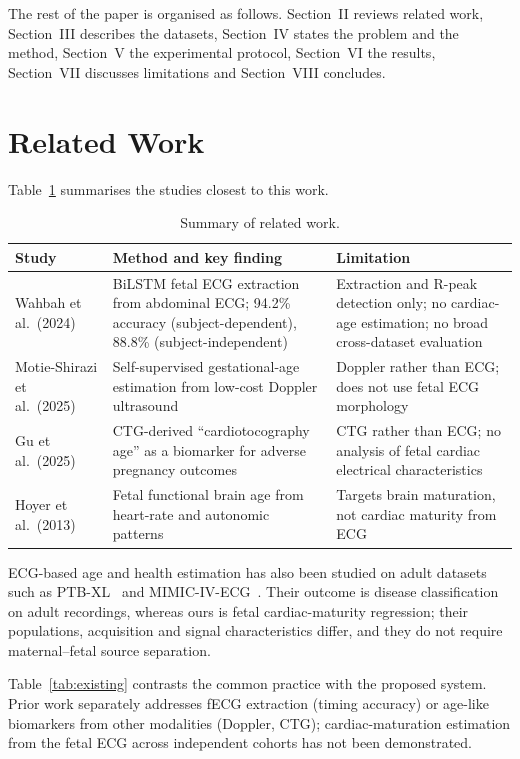 \documentclass[journal]{IEEEtran}
\begin{document}
The rest of the paper is organised as follows. Section~II reviews related work, Section~III describes the datasets, Section~IV states the problem and the method, Section~V the experimental protocol, Section~VI the results, Section~VII discusses limitations and Section~VIII concludes.

\section{Related Work}
Table~\ref{tab:related} summarises the studies closest to this work.

\begin{table}[!t]
\caption{Summary of related work.}
\label{tab:related}
\centering
\small
\begin{tabular}{@{}p{3.0cm}p{6.8cm}p{6.8cm}@{}}
\toprule
Study & Method and key finding & Limitation \\
\midrule
Wahbah et al.\ (2024)~\cite{wahbah2024} & BiLSTM fetal ECG extraction from abdominal ECG; 94.2\% accuracy (subject-dependent), 88.8\% (subject-independent) & Extraction and R-peak detection only; no cardiac-age estimation; no broad cross-dataset evaluation \\
Motie-Shirazi et al.\ (2025)~\cite{motie2025} & Self-supervised gestational-age estimation from low-cost Doppler ultrasound & Doppler rather than ECG; does not use fetal ECG morphology \\
Gu et al.\ (2025)~\cite{gu2025} & CTG-derived ``cardiotocography age'' as a biomarker for adverse pregnancy outcomes & CTG rather than ECG; no analysis of fetal cardiac electrical characteristics \\
Hoyer et al.\ (2013)~\cite{hoyer2013} & Fetal functional brain age from heart-rate and autonomic patterns & Targets brain maturation, not cardiac maturity from ECG \\
\bottomrule
\end{tabular}
\end{table}

ECG-based age and health estimation has also been studied on adult datasets such as PTB-XL~\cite{ptbxl} and MIMIC-IV-ECG~\cite{mimicecg}. Their outcome is disease classification on adult recordings, whereas ours is fetal cardiac-maturity regression; their populations, acquisition and signal characteristics differ, and they do not require maternal--fetal source separation.

Table~\ref{tab:existing} contrasts the common practice with the proposed system. Prior work separately addresses fECG extraction (timing accuracy) or age-like biomarkers from other modalities (Doppler, CTG); cardiac-maturation estimation from the fetal ECG across independent cohorts has not been demonstrated.
\end{document}
